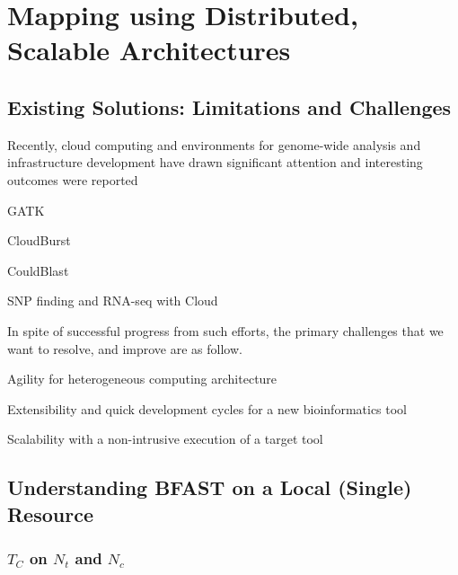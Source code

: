 \documentclass{acm_proc_article-sp}
\begin{document}
\section{Mapping using Distributed, Scalable Architectures}

\subsection{Existing Solutions: Limitations and Challenges}


Recently, cloud computing and environments for genome-wide analysis
and infrastructure development have drawn significant attention and
interesting outcomes were reported\cite{taylor2010,cloudburst,
  cloudblast, langmead2009, langmead2010,gatk, halligan2009}

\begin{itemize*}
\item GATK\cite{gatk}
\item CloudBurst\cite{cloudburst}
\item CouldBlast\cite{cloudblast}
\item SNP finding and RNA-seq with Cloud\cite{langmead2009, langmead2010}
\end{itemize*}

In spite of successful progress from such efforts, the primary
challenges that we want to resolve, and improve are as follow.
\begin{itemize*}
\item Agility for heterogeneous computing architecture
\item Extensibility and quick development cycles for a new bioinformatics tool
\item Scalability with a non-intrusive execution of a target tool  
\end{itemize*}


\subsection{Understanding BFAST on a Local (Single) Resource}

\subsubsection{$T_{C}$ on $N_t$ and $N_c$}
\end{document}
